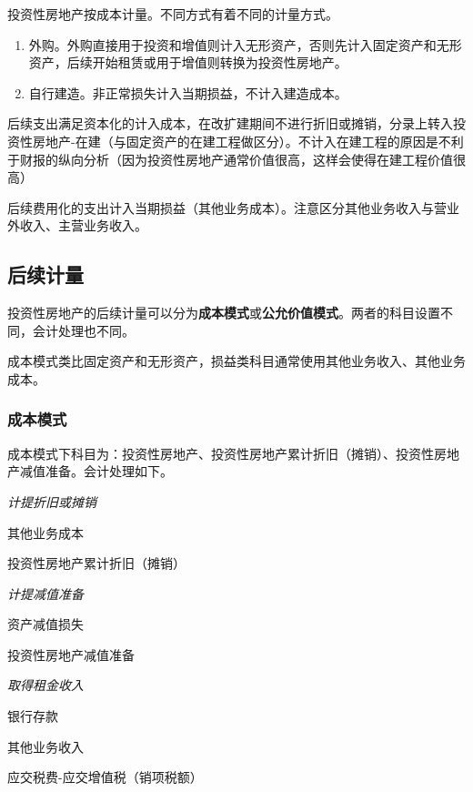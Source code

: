\documentclass[UTF8,12pt]{ctexart}
\newenvironment{Dr}{%
	\begin{list}{}%
		{
			\setlength{\leftmargin}{2em}
			\setlength{\labelwidth}{2em}
			\setlength{\labelsep}{0pt}
			\setlength{\itemindent}{0pt}
			\setlength{\listparindent}{0pt}
			\setlength{\parsep}{0pt}
			\setlength{\topsep}{0pt}
		}
		\item[\textbf{借：}]
	}{%
	\end{list}
}
\newenvironment{Cr}{%
	\begin{list}{}%
		{
			\setlength{\leftmargin}{2em}
			\setlength{\labelwidth}{2em}
			\setlength{\labelsep}{0pt}
			\setlength{\itemindent}{0pt}
			\setlength{\listparindent}{0pt}
			\setlength{\parsep}{0pt}
			\setlength{\topsep}{0pt}
		}
		\item[\textbf{贷：}]
	}{%
	\end{list}
}
\numberwithin{equation}{section} %
\numberwithin{figure}{section}
\numberwithin{table}{section}
\begin{document}
	
	投资性房地产按成本计量。不同方式有着不同的计量方式。
	
	\begin{enumerate}
		\item 外购。外购直接用于投资和增值则计入无形资产，否则先计入固定资产和无形资产，后续开始租赁或用于增值则转换为投资性房地产。
		
		\item 自行建造。非正常损失计入当期损益，不计入建造成本。
	\end{enumerate}
	
	后续支出满足资本化的计入成本，在改扩建期间不进行折旧或摊销，分录上转入投资性房地产-在建（与固定资产的在建工程做区分）。不计入在建工程的原因是不利于财报的纵向分析（因为投资性房地产通常价值很高，这样会使得在建工程价值很高）
	
	后续费用化的支出计入当期损益（其他业务成本）。注意区分其他业务收入与营业外收入、主营业务收入。
	
	\subsection{后续计量}
	投资性房地产的后续计量可以分为\textbf{成本模式}或\textbf{公允价值模式}。两者的科目设置不同，会计处理也不同。
	
	成本模式类比固定资产和无形资产，损益类科目通常使用其他业务收入、其他业务成本。
	
	\subsubsection{成本模式}
	成本模式下科目为：投资性房地产、投资性房地产累计折旧（摊销）、投资性房地产减值准备。会计处理如下。
	
	\textit{计提折旧或摊销}
	
	\begin{Dr}
		其他业务成本
	\end{Dr}
	\begin{Cr}
		投资性房地产累计折旧（摊销）
	\end{Cr}
	
	\textit{计提减值准备}
	
	\begin{Dr}
		资产减值损失
	\end{Dr}
	\begin{Cr}
		投资性房地产减值准备
	\end{Cr}

	
	\textit{取得租金收入}
	
	\begin{Dr}
		银行存款
	\end{Dr}
	\begin{Cr}
		其他业务收入
		
		应交税费-应交增值税（销项税额）
	\end{Cr}
	
\end{document}
